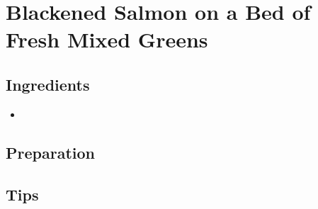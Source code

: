 \thispagestyle{fancy}
\section{Blackened Salmon on a Bed of Fresh Mixed Greens}
\AddToShipoutPicture*{\SalmonSalad}

\subsection*{Ingredients}
\begin{multicols}{3}
	\begin{itemize}
		\item 
	\end{itemize}
\end{multicols}


\subsection*{Preparation}

\subsection*{Tips}
